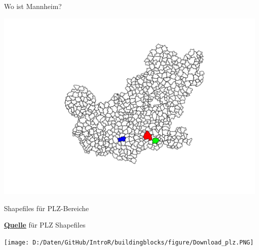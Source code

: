 \documentclass[ignorenonframetext,]{beamer}
\newenvironment{Shaded}{\begin{snugshade}}{\end{snugshade}}
\newcommand{\KeywordTok}[1]{\textcolor[rgb]{0.26,0.66,0.93}{\textbf{#1}}}
\newcommand{\DataTypeTok}[1]{\textcolor[rgb]{0.74,0.68,0.62}{\underline{#1}}}
\newcommand{\StringTok}[1]{\textcolor[rgb]{0.02,0.61,0.04}{#1}}
\newcommand{\OperatorTok}[1]{\textcolor[rgb]{0.74,0.68,0.62}{#1}}
\newcommand{\NormalTok}[1]{\textcolor[rgb]{0.74,0.68,0.62}{#1}}
\begin{document}
\begin{frame}[fragile]{Wo ist Mannheim?}

\begin{Shaded}
\end{Shaded}

\includegraphics{Geomedizin_files/figure-beamer/unnamed-chunk-89-1.pdf}

\end{frame}

\begin{frame}{Shapefiles für PLZ-Bereiche}

\begin{block}{\href{http://arnulf.us/PLZ}{\textbf{Quelle}} für PLZ
Shapefiles}

\texttt{[image: D:/Daten/GitHub/IntroR/buildingblocks/figure/Download\_plz.PNG]}

\end{block}

\end{frame}
\end{document}
